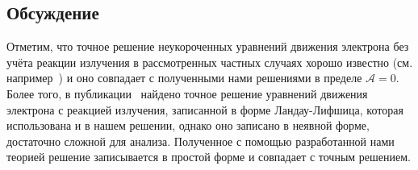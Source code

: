 
\subsection{Обсуждение}
Отметим, что точное решение неукороченных уравнений движения электрона без учёта реакции излучения в рассмотренных частных случаях хорошо известно (см. например~\cite{LandauII}) и оно совпадает с полученными нами решениями в пределе $\mathcal{A}=0$.
Более того, в публикации~\cite{di2008exact} найдено точное решение уравнений движения электрона с реакцией излучения, записанной в форме Ландау-Лифшица, которая использована и в нашем решении, однако оно записано в неявной форме, достаточно сложной для анализа.
Полученное с помощью разработанной нами теорией решение записывается в простой форме и совпадает с точным решением.

